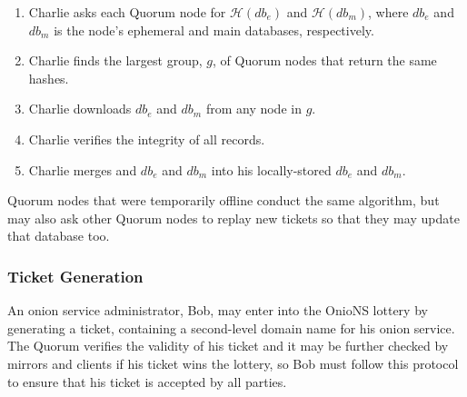 \documentclass[USenglish,oneside,twocolumn]{article}
\begin{document}
\begin{enumerate}
	\item Charlie asks each Quorum node for $ \mathcal{H}(\mathit{db}_{e}) $ and $ \mathcal{H}(\mathit{db}_{m}) $, where $ \mathit{db}_{e} $ and $ \mathit{db}_{m} $ is the node's ephemeral and main databases, respectively.
	\item Charlie finds the largest group, $ g $, of Quorum nodes that return the same hashes.
	\item Charlie downloads $ \mathit{db}_{e} $ and $ \mathit{db}_{m} $ from any node in $ g $.
	\item Charlie verifies the integrity of all records.
	\item Charlie merges and $ \mathit{db}_{e} $ and $ \mathit{db}_{m} $ into his locally-stored $ \mathit{db}_{e} $ and $ \mathit{db}_{m} $.
\end{enumerate}

Quorum nodes that were temporarily offline conduct the same algorithm, but may also ask other Quorum nodes to replay new tickets so that they may update that database too. %


\subsubsection{Ticket Generation}
\label{sec:ticketGeneration}

An onion service administrator, Bob, may enter into the OnioNS lottery by generating a ticket, containing a second-level domain name for his onion service. The Quorum verifies the validity of his ticket and it may be further checked by mirrors and clients if his ticket wins the lottery, so Bob must follow this protocol to ensure that his ticket is accepted by all parties.
\end{document}
